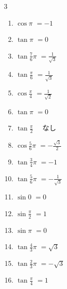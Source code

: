 \begin{multicols}{3}
\begin{enumerate}
  \item $\displaystyle \cos{\pi}$
        $\displaystyle =-1$

  \item $\displaystyle \tan{\pi}$
        $\displaystyle =0$

  \item $\displaystyle \tan{\frac{7}{6}\pi}$
        $\displaystyle =\frac{1}{\sqrt{3}}$

  \item $\displaystyle \tan{\frac{\pi}{6}}$
        $\displaystyle =\frac{1}{\sqrt{3}}$

  \item $\displaystyle \cos{\frac{\pi}{4}}$
        $\displaystyle =\frac{1}{\sqrt{2}}$

  \item $\displaystyle \tan{\pi}$
        $\displaystyle =0$

\columnbreak %

\resetques

  \item $\displaystyle \tan{\frac{\pi}{2}}$
        $\displaystyle \quad なし$

  \item $\displaystyle \cos{\frac{5}{6}\pi}$
        $\displaystyle =-\frac{\sqrt{3}}{2}$

  \item $\displaystyle \tan{\frac{3}{4}\pi}$
        $\displaystyle =-1$

  \item $\displaystyle \tan{\frac{5}{6}\pi}$
        $\displaystyle =-\frac{1}{\sqrt{3}}$

  \item $\displaystyle \sin{0}$
        $\displaystyle =0$

  \item $\displaystyle \sin{\frac{\pi}{2}}$
        $\displaystyle =1$

  \item $\displaystyle \sin{\pi}$
        $\displaystyle =0$

  \item $\displaystyle \tan{\frac{4}{3}\pi}$
        $\displaystyle =\sqrt{3}$

  \item $\displaystyle \tan{\frac{2}{3}\pi}$
        $\displaystyle =-\sqrt{3}$

  \item $\displaystyle \tan{\frac{\pi}{4}}$
        $\displaystyle =1$


\end{enumerate}
\end{multicols}
